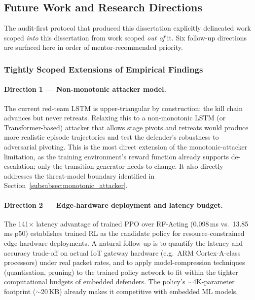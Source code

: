 \subsection{Future Work and Research Directions}\label{subsec:future_work}
The audit-first protocol that produced this dissertation explicitly delineated work scoped \emph{into} this dissertation from work scoped \emph{out of} it. Six follow-up directions are surfaced here in order of mentor-recommended priority.

\subsubsection{Tightly Scoped Extensions of Empirical Findings}

\paragraph{Direction 1 --- Non-monotonic attacker model.} The current red-team LSTM is upper-triangular by construction: the kill chain advances but never retreats. Relaxing this to a non-monotonic LSTM (or Transformer-based) attacker that allows stage pivots and retreats would produce more realistic episode trajectories and test the defender's robustness to adversarial pivoting. This is the most direct extension of the monotonic-attacker limitation, as the training environment's reward function already supports de-escalation; only the transition generator needs to change. It also directly addresses the threat-model boundary identified in Section~\ref{subsubsec:monotonic_attacker}.

\paragraph{Direction 2 --- Edge-hardware deployment and latency budget.} The 141$\times$ latency advantage of trained PPO over RF-Acting (0.098\,ms vs.\ 13.85\,ms p50) establishes trained RL as the candidate policy for resource-constrained edge-hardware deployments. A natural follow-up is to quantify the latency and accuracy trade-off on actual IoT gateway hardware (e.g.\ ARM Cortex-A-class processors) under real packet rates, and to apply model-compression techniques (quantisation, pruning) to the trained policy network to fit within the tighter computational budgets of embedded defenders. The policy's $\sim$4K-parameter footprint ($\sim$20\,KB) already makes it competitive with embedded ML models.

